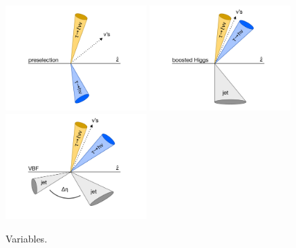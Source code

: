 \begin{figure}[tp]
  \centering
  \includegraphics[width=0.48\textwidth]{figures/category-cartoons/presel}
  \includegraphics[width=0.48\textwidth]{figures/category-cartoons/boost}
  \includegraphics[width=0.48\textwidth]{figures/category-cartoons/vbf}
  \caption{Variables.}
  \label{fig:strategy-category-cartoons}
\end{figure}


